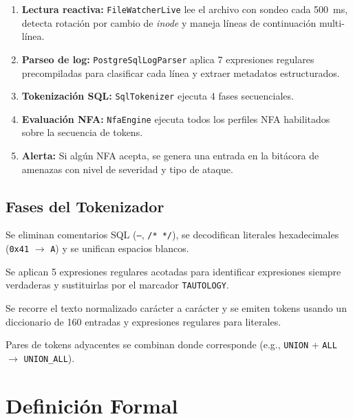 \documentclass[12pt, a4paper]{report}
\theoremstyle{definition}
\theoremstyle{remark}
\newcommand{\tok}[1]{\texttt{\color{codeblue}#1}}
\begin{document}
\begin{enumerate}
  \item \textbf{Lectura reactiva:} \texttt{FileWatcherLive} lee el archivo con
        sondeo cada 500~ms, detecta rotación por cambio de \emph{inode} y
        maneja líneas de continuación multi-línea.
  \item \textbf{Parseo de log:} \texttt{PostgreSqlLogParser} aplica 7 expresiones
        regulares precompiladas para clasificar cada línea y extraer metadatos
        estructurados.
  \item \textbf{Tokenización SQL:} \texttt{SqlTokenizer} ejecuta 4 fases secuenciales.
  \item \textbf{Evaluación NFA:} \texttt{NfaEngine} ejecuta todos los perfiles NFA
        habilitados sobre la secuencia de tokens.
  \item \textbf{Alerta:} Si algún NFA acepta, se genera una entrada en la bitácora
        de amenazas con nivel de severidad y tipo de ataque.
\end{enumerate}

\section{Fases del Tokenizador}

\begin{description}[leftmargin=3.5cm]
  \item[Fase 1 — Normalización] Se eliminan comentarios SQL (\texttt{--},
        \texttt{/* */}), se decodifican literales hexadecimales
        (\texttt{0x41} $\to$ \texttt{A}) y se unifican espacios blancos.
  \item[Fase 2 — Detección de tautologías] Se aplican 5 expresiones regulares
        acotadas para identificar expresiones siempre verdaderas y sustituirlas
        por el marcador \tok{TAUTOLOGY}.
  \item[Fase 3 — Escaneo léxico] Se recorre el texto normalizado carácter a
        carácter y se emiten tokens usando un diccionario de 160 entradas y
        expresiones regulares para literales.
  \item[Fase 4 — Fusión] Pares de tokens adyacentes se combinan donde
        corresponde (e.g., \tok{UNION} + \tok{ALL} $\to$ \tok{UNION\_ALL}).
\end{description}

\chapter{Definición Formal}
\end{document}
